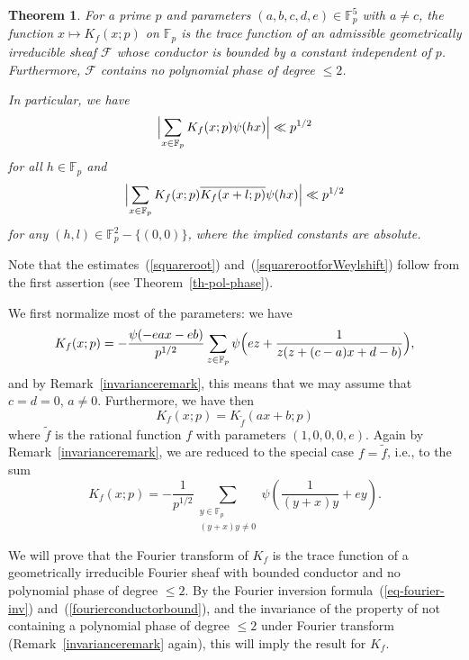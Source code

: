 \documentclass[12pt,a4paper,reqno]{amsart}
\numberwithin{equation}{section}
\theoremstyle{plain}
\newtheorem{theorem}{Theorem}[section]
\theoremstyle{definition}
\newcommand\F{\mathbb{F}}
\newcommand\ov{\overline}
\newcommand\mcF{\mathcal{F}}
\newcommand\Fp{\F_{p}}
\begin{document}
\begin{theorem}\label{kf-bound} For a prime $p$ and parameters
  $(a,b,c,d,e)\in\Fp^5$ with $a\neq c$, the function $x\mapsto
  K_f(x;p)$ on $\Fp$ is the trace function of an admissible
  geometrically irreducible sheaf $\mcF$ whose conductor is bounded by a
  constant independent of $p$. Furthermore, $\mcF$ contains no
  polynomial phase of degree $\leq 2$.
\par
In particular, we have
\begin{equation}\label{squareroot}
  \Bigl|\sum_{x\in\Fp}K_f(x;p)\psi(hx)\Bigr|\ll p^{1/2}
\end{equation}
for all $h \in \Fp$ and
\begin{equation}\label{squarerootforWeylshift}
  \Bigl|\sum_{x\in\Fp}K_f(x;p)\ov{K_f(x+l;p)}\psi(hx)\Bigr|\ll p^{1/2}
\end{equation}
for any $(h,l)\in\Fp^2-\{(0,0)\}$, where the implied constants are
absolute.
\end{theorem}

\proof Note that the estimates~(\ref{squareroot})
and~(\ref{squarerootforWeylshift}) follow from the first assertion
(see Theorem~\ref{th-pol-phase}).
\par
We first normalize most of the parameters: we have
$$
K_f(x;p)=-\frac{\psi(-eax-eb)}{p^{1/2}}\sum_{z\in\Fp}
\psi\Bigl(ez+\frac{1}{z(z+(c-a)x+d-b)}\Bigr),
$$
and by Remark~\ref{invarianceremark}, this means that we may assume
that $c=d=0$, $a\neq 0$. Furthermore, we have then
$$
K_f(x;p)=K_{\tilde{f}}(ax+b;p)
$$
where $\tilde{f}$ is the rational function $f$ with parameters
$(1,0,0,0,e)$. Again by Remark~\ref{invarianceremark}, we are reduced
to the special case $f=\tilde f$, i.e., to the sum
$$
K_f(x;p) =-\frac{1}{p^{1/2}}\sum_{\substack{y\in \Fp\\(y+x)y\neq 0}}
\psi\left(\frac{1}{(y+x)y} + ey\right).
$$

We will prove that the Fourier transform of $K_f$ is the trace
function of a geometrically irreducible Fourier sheaf with bounded
conductor and no polynomial phase of degree $\leq 2$. By the Fourier
inversion formula~(\ref{eq-fourier-inv})
and~(\ref{fourierconductorbound}), and the invariance of the property
of not containing a polynomial phase of degree $\leq 2$ under Fourier
transform (Remark~\ref{invarianceremark} again), this will imply the
result for $K_f$.
\end{document}
